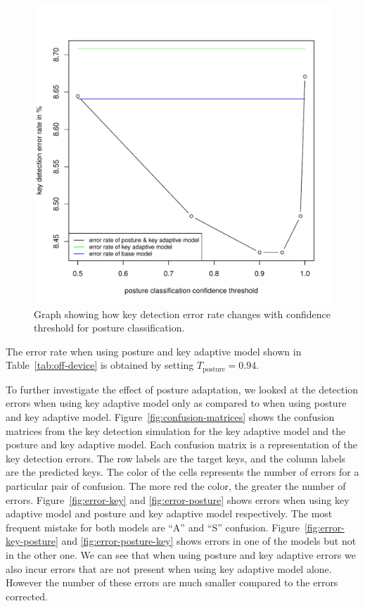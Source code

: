\documentclass{sigchi}
\begin{document}
\begin{figure}[tb]
 \includegraphics[width=0.9\columnwidth]{figures/error-confidence.pdf}
  \caption{Graph showing how key detection error rate changes with confidence
  threshold for posture classification.}
  \label{fig:posture-confidence}
\end{figure}

The error rate when using posture and key adaptive model shown in Table~\ref{tab:off-device}
is obtained by setting $T_{\text{posture}} = 0.94$.

To further investigate the effect of posture adaptation, we looked at the detection
errors when using key adaptive model only as compared to when using posture and key adaptive model.
Figure~\ref{fig:confusion-matrices} shows the confusion matrices from the key detection
simulation for the key adaptive model and the posture and key adaptive model. Each 
confusion matrix is a representation of the key detection errors. The row labels are
the target keys, and the column labels are the predicted keys. The color of the cells
represents the number of errors for a particular pair of confusion. The more red the color,
the greater the number of errors. Figure~\ref{fig:error-key} and \ref{fig:error-posture}
shows errors when using key adaptive model and posture and key adaptive model respectively.
The most frequent mistake for both models are ``A'' and ``S'' confusion. Figure~\ref{fig:error-key-posture}
and \ref{fig:error-posture-key} shows errors in one of the models but not in the other one.
We can see that when using posture and key adaptive errors we also incur errors
that are not present when using key adaptive model alone. However the number of these
errors are much smaller compared to the errors corrected.
\end{document}
